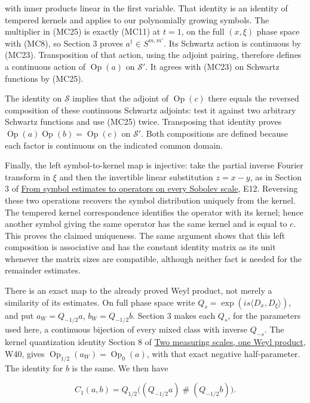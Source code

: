 \documentclass[
  11pt,
]{article}
\begin{document}
with inner products linear in the first variable. That identity is an
identity of tempered kernels and applies to our polynomially growing
symbols. The multiplier in (MC25) is exactly (MC11) at \(t=1\), on the
full \((x,\xi)\) phase space with (MC8), so Section 3 proves
\(a^\dagger\in S^{m,m'}\). Its Schwartz action is continuous by (MC23).
Transposition of that action, using the adjoint pairing, therefore
defines a continuous action of \(\operatorname{Op}(a)\) on
\(\mathcal S'\). It agrees with (MC23) on Schwartz functions by (MC25).

The identity on \(\mathcal S\) implies that the adjoint of
\(\operatorname{Op}(c)\) there equals the reversed composition of these
continuous Schwartz adjoints: test it against two arbitrary Schwartz
functions and use (MC25) twice. Transposing that identity proves
\(\operatorname{Op}(a)\operatorname{Op}(b)=\operatorname{Op}(c)\) on
\(\mathcal S'\). Both compositions are defined because each factor is
continuous on the indicated common domain.

Finally, the left symbol-to-kernel map is injective: take the partial
inverse Fourier transform in \(\xi\) and then the invertible linear
substitution \(z=x-y\), as in Section 3 of
\href{euclidean-symbol-calculus.pdf}{From symbol estimates to operators
on every Sobolev scale}, E12. Reversing these two operations recovers
the symbol distribution uniquely from the kernel. The tempered kernel
correspondence identifies the operator with its kernel; hence another
symbol giving the same operator has the same kernel and is equal to
\(c\). This proves the claimed uniqueness. The same argument shows that
this left composition is associative and has the constant identity
matrix as its unit whenever the matrix sizes are compatible, although
neither fact is needed for the remainder estimates.

There is an exact map to the already proved Weyl product, not merely a
similarity of its estimates. On full phase space write
\(Q_s=\exp(is\langle D_x,D_\xi\rangle)\), and put \(a_W=Q_{-1/2}a\),
\(b_W=Q_{-1/2}b\). Section 3 makes each \(Q_s\), for the parameters used
here, a continuous bijection of every mixed class with inverse
\(Q_{-s}\). The kernel quantization identity Section 8 of
\href{weyl-metric-products.pdf}{Two measuring scales, one Weyl product},
W40, gives \(\operatorname{Op}_{1/2}(a_W)=\operatorname{Op}_0(a)\), with
that exact negative half-parameter. The identity for \(b\) is the same.
We then have

\[
C_1(a,b)=Q_{1/2}\bigl((Q_{-1/2}a)\mathbin{\#}(Q_{-1/2}b)\bigr).
\tag{MC25a}
\]
\end{document}
